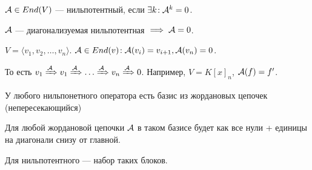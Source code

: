 \begin{definition}
$\mathcal{A} \in End(V)$ --- нильпотентный, если  $\exists k\!: \mathcal{A}^k = 0$.    
\end{definition}
\begin{remark}
    $\mathcal{A}$ --- диагонализуемая нильпотентная  $\implies \mathcal{A} = 0$.
\end{remark}
\begin{example}
    $V = \langle v_1, v_2, \ldots, v_n \rangle$. $\mathcal{A} \in End(v)\!: \mathcal{A}(v_i) = v_{i+1}, \mathcal{A}(v_n) = 0$.

    То есть  $v_1 \xRightarrow{\mathcal{A}} v_1 \xRightarrow{\mathcal{A}} \ldots \xRightarrow{\mathcal{A}} v_n \xRightarrow{\mathcal{A}} 0$. Например, $V = K[x]_n$,  $\mathcal{A}(f) = f'$.
\end{example}
\begin{theorem}
    У любого нильпонетного оператора есть базис из жордановых цепочек (непересекающийся)
\end{theorem}
\begin{remark}
    Для любой жордановой цепочки $\mathcal{A}$ в таком базисе будет как все нули + единицы на диагонали снизу от главной.

    Для нильпотентного --- набор таких блоков.
\end{remark}
